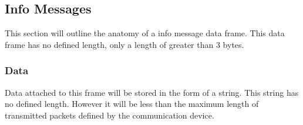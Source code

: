 \documentclass{article}
\begin{document}
  \pagebreak
  
  \subsection{Info Messages}
  This section will outline the anatomy of a info message data frame. This data frame has no defined length, only a length of greater than 3 bytes.
  
  \subsubsection{Data}
  Data attached to this frame will be stored in the form of a string. This string has no defined length. However it will be less than the maximum length of transmitted packets defined by the communication device.
   
  
  
  
\end{document}
